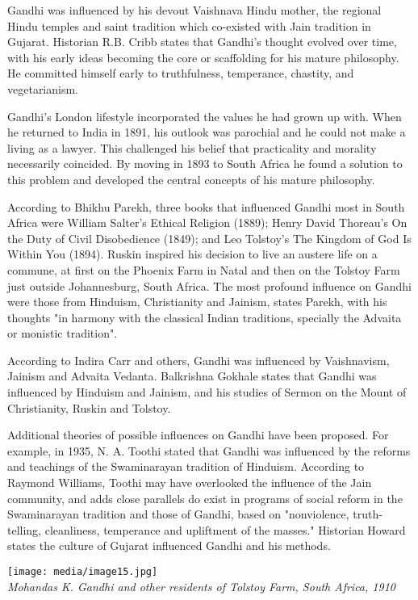 Gandhi was influenced by his devout Vaishnava Hindu mother, the regional
Hindu temples and saint tradition which co-existed with Jain tradition
in Gujarat. Historian R.B. Cribb states that Gandhi's thought evolved
over time, with his early ideas becoming the core or scaffolding for his
mature philosophy. He committed himself early to truthfulness,
temperance, chastity, and vegetarianism.

Gandhi's London lifestyle incorporated the values he had grown up with.
When he returned to India in 1891, his outlook was parochial and he
could not make a living as a lawyer. This challenged his belief that
practicality and morality necessarily coincided. By moving in 1893 to
South Africa he found a solution to this problem and developed the
central concepts of his mature philosophy.

According to Bhikhu Parekh, three books that influenced Gandhi most in
South Africa were William Salter's Ethical Religion (1889); Henry David
Thoreau's On the Duty of Civil Disobedience (1849); and Leo Tolstoy's
The Kingdom of God Is Within You (1894). Ruskin inspired his decision to
live an austere life on a commune, at first on the Phoenix Farm in Natal
and then on the Tolstoy Farm just outside Johannesburg, South Africa.
The most profound influence on Gandhi were those from Hinduism,
Christianity and Jainism, states Parekh, with his thoughts "in harmony
with the classical Indian traditions, specially the Advaita or monistic
tradition".

According to Indira Carr and others, Gandhi was influenced by
Vaishnavism, Jainism and Advaita Vedanta. Balkrishna Gokhale states that
Gandhi was influenced by Hinduism and Jainism, and his studies of Sermon
on the Mount of Christianity, Ruskin and Tolstoy.

Additional theories of possible influences on Gandhi have been proposed.
For example, in 1935, N. A. Toothi stated that Gandhi was influenced by
the reforms and teachings of the Swaminarayan tradition of Hinduism.
According to Raymond Williams, Toothi may have overlooked the influence
of the Jain community, and adds close parallels do exist in programs of
social reform in the Swaminarayan tradition and those of Gandhi, based
on "nonviolence, truth-telling, cleanliness, temperance and upliftment
of the masses." Historian Howard states the culture of Gujarat
influenced Gandhi and his methods.

\texttt{[image: media/image15.jpg]}\\
\emph{Mohandas K. Gandhi and other residents of Tolstoy Farm, South
Africa, 1910}

